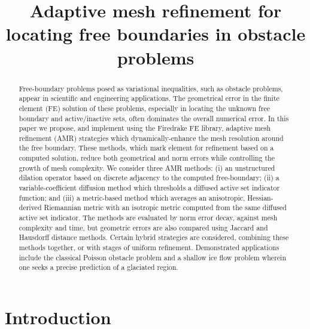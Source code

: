 \documentclass[]{interact}
\theoremstyle{plain}%
\theoremstyle{definition}
\theoremstyle{remark}
\begin{document}

\title{Adaptive mesh refinement for locating free boundaries in obstacle problems}

\author{
}

\maketitle

\begin{abstract}
Free-boundary problems posed as variational inequalities, such as obstacle problems, appear in scientific and engineering applications.  The geometrical error in the finite element (FE) solution of these problems, especially in locating the unknown free boundary and active/inactive sets, often dominates the overall numerical error.  In this paper we propose, and implement using the Firedrake FE library, adaptive mesh refinement (AMR) strategies which dynamically-enhance the mesh resolution around the free boundary.  These methods, which mark element for refinement based on a computed solution, reduce both geometrical and norm errors while controlling the growth of mesh complexity.  We consider three AMR methods: (i) an unstructured dilation operator based on discrete adjacency to the computed free-boundary; (ii) a variable-coefficient diffusion method which thresholds a diffused active set indicator function; and (iii) a metric-based method which averages an anisotropic, Hessian-derived Riemannian metric with an isotropic metric computed from the same diffused active set indicator.  The methods are evaluated by norm error decay, against mesh complexity and time, but geometric errors are also compared using Jaccard and Hausdorff distance methods.  Certain hybrid strategies are considered, combining these methods together, or with stages of uniform refinement.  Demonstrated applications include the classical Poisson obstacle problem and a shallow ice flow problem wherein one seeks a precise prediction of a glaciated region.
\end{abstract}



\section{Introduction} \label{sec:intro}
\end{document}
